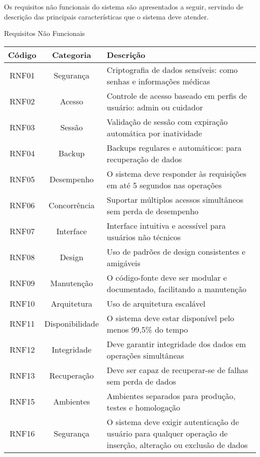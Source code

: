 Os requisitos não funcionais do sistema são apresentados a seguir, servindo de descrição das principais características que o sistema deve atender.

\renewcommand{\arraystretch}{1.5} %

\begin{quadro}
    \caption{\label{quadro_requisitos_nf}Requisitos Não Funcionais}
    \begin{tabular}{|c|c|p{10cm}|}
        \hline
        \textbf{Código} & \textbf{Categoria} & \textbf{Descrição} \\ \hline
        RNF01  & Segurança       & Criptografia de dados sensíveis: como senhas e informações médicas \\ \hline
        RNF02  & Acesso          & Controle de acesso baseado em perfis de usuário: admin ou cuidador \\ \hline
        RNF03  & Sessão          & Validação de sessão com expiração automática por inatividade \\ \hline
        RNF04  & Backup          & Backups regulares e automáticos: para recuperação de dados \\ \hline
        RNF05  & Desempenho      & O sistema deve responder às requisições em até 5 segundos nas operações \\ \hline
        RNF06  & Concorrência    & Suportar múltiplos acessos simultâneos sem perda de desempenho \\ \hline
        RNF07  & Interface       & Interface intuitiva e acessível para usuários não técnicos \\ \hline
        RNF08  & Design          & Uso de padrões de design consistentes e amigáveis \\ \hline
        RNF09  & Manutenção      & O código-fonte deve ser modular e documentado, facilitando a manutenção \\ \hline
        RNF10  & Arquitetura     & Uso de arquitetura escalável \\ \hline
        RNF11  & Disponibilidade & O sistema deve estar disponível pelo menos 99,5\% do tempo \\ \hline
        RNF12  & Integridade     & Deve garantir integridade dos dados em operações simultâneas \\ \hline
        RNF13  & Recuperação     & Deve ser capaz de recuperar-se de falhas sem perda de dados \\ \hline
        RNF15  & Ambientes       & Ambientes separados para produção, testes e homologação \\ \hline
        RNF16  & Segurança       & O sistema deve exigir autenticação de usuário para qualquer operação de inserção, alteração ou exclusão de dados \\ \hline
    \end{tabular}
\end{quadro}
